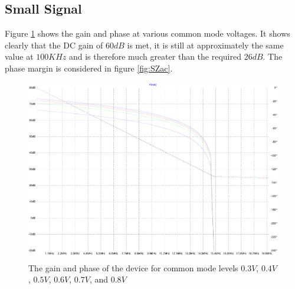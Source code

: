 \subsection{Small Signal}

Figure \ref{fig:Sac} shows the gain and phase at various common mode voltages.
It shows clearly that the DC gain of $60dB$ is met, it is still at approximately the same value at $100KHz$ and is therefore much greater than the required $26dB$.
The phase margin is considered in figure \ref{fig:SZac}.

\begin{figure}[H]
	\centering
	\includegraphics[width=\textwidth]{./images/BasicAC-multi.pdf}
	\caption{The gain and phase of the device for common mode levels $0.3V$, $0.4V$, $0.5V$, $0.6V$, $0.7V$, and $0.8V$}
	\label{fig:Sac}
\end{figure}

